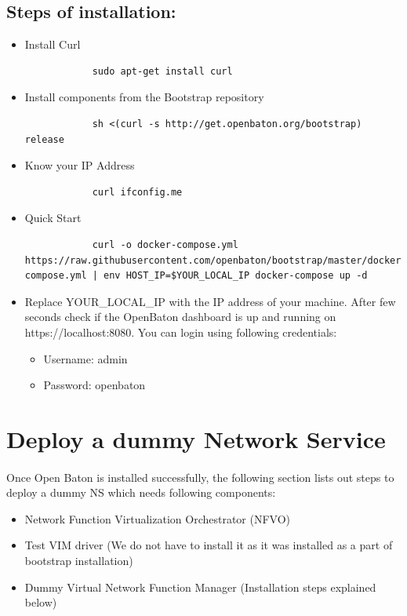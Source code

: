 		\subsection*{Steps of installation:}
		\begin{itemize}
			
			\item Install Curl
			\begin{lstlisting}
			sudo apt-get install curl 
			\end{lstlisting}
			
			\item Install components from the Bootstrap repository
			\begin{lstlisting}
			sh <(curl -s http://get.openbaton.org/bootstrap) release
			\end{lstlisting}
			
			\item Know your IP Address
			\begin{lstlisting}
			curl ifconfig.me
			\end{lstlisting}
			
			\item Quick Start
			\begin{lstlisting}
			curl -o docker-compose.yml https://raw.githubusercontent.com/openbaton/bootstrap/master/docker-compose.yml | env HOST_IP=$YOUR_LOCAL_IP docker-compose up -d
			\end{lstlisting}
			
			\item Replace YOUR_LOCAL_IP with the IP address of your machine. After few seconds check if the OpenBaton dashboard is up and running on https://localhost:8080.
			You can login using following credentials:
			\begin{itemize}
				\item Username: admin
				\item Password: openbaton
			\end{itemize}
		\end{itemize}
			
	\section{Deploy a dummy Network Service}
	\label{Deploy a dummy Network Service}
			\paragraph{}
			Once Open Baton is installed successfully, the following section lists out steps to deploy a dummy NS which needs following components:
			\begin{itemize}
				\item Network Function Virtualization Orchestrator (NFVO)
				\item Test VIM driver (We do not have to install it as it was installed as a part of bootstrap installation)
				\item Dummy Virtual Network Function Manager (Installation steps explained below)
			\end{itemize}
		
